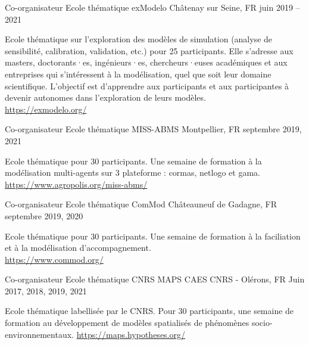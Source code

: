 \begin{cventries}
    \cventry
      {Co-organisateur} %
      {Ecole thématique exModelo} %
      {Châtenay sur Seine, FR} %
      {juin 2019 -- 2021} %
      {
        \begin{cvitems} %
          Ecole thématique sur l’exploration des modèles de simulation (analyse de sensibilité, calibration, validation, etc.) pour 25 participants. Elle s’adresse aux masters, doctorants·es, ingénieurs·es, chercheurs·euses académiques et aux entreprises qui s’intéressent à la modélisation, quel que soit leur domaine scientifique. L’objectif est d’apprendre aux participants et aux participantes à devenir autonomes dans l’exploration de leurs modèles.\\
          \url{https://exmodelo.org/}
          \end{cvitems}
      }
    \cventry
      {Co-organisateur} %
      {Ecole thématique MISS-ABMS} %
      {Montpellier, FR} %
      {septembre 2019, 2021} %
      {
      \begin{cvitems} %
        Ecole thématique pour 30 participants. Une semaine de formation à la modélisation multi-agents sur 3 plateforme : cormas, netlogo et gama.\\
        \url{https://www.agropolis.org/miss-abms/}
      \end{cvitems}
      }
    \cventry
      {Co-organisateur} %
      {Ecole thématique ComMod} %
      {Châteauneuf de Gadagne, FR} %
      {septembre 2019, 2020} %
      {
      \begin{cvitems} %
        Ecole thématique pour 30 participants. Une semaine de formation à la faciliation et à la modélisation d'accompagnement.\\
        \url{https://www.commod.org/}
      \end{cvitems}
      }
  \cventry
    {Co-organisateur} %
    {Ecole thématique CNRS MAPS} %
    {CAES CNRS - Olérons, FR} %
    {Juin 2017, 2018, 2019, 2021} %
    {
      \begin{cvitems} %
        Ecole thématique labellisée par le CNRS. Pour 30 participants, une semaine de formation au développement de modèles spatialisés de phénomènes socio-environnementaux. \url{https://maps.hypotheses.org/}
        \end{cvitems}
    }


\end{cventries}
